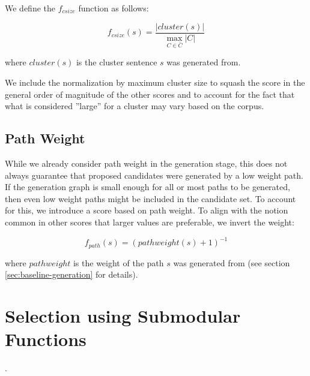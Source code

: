 \documentclass[a4paper,BCOR=10mm]{report}
\numberwithin{lemma}{chapter}
\numberwithin{definition}{chapter}
\begin{document}
We define the $f_{\mathit{csize}}$ function as follows:

\begin{equation}
f_{\mathit{csize}}(s) = \frac{|\mathit{cluster}(s)|}{\max_{C \in \bar{C}}{|C|}}
\end{equation}

where $\mathit{cluster}(s)$ is the cluster sentence $s$ was generated from.

We include the normalization by maximum cluster size to squash the score in the general order of magnitude of the other scores and to account for the fact that what is considered ''large'' for a cluster may vary based on the corpus.


\subsection{Path Weight}

While we already consider path weight in the generation stage, this does not always guarantee that proposed candidates were generated by a low weight path. If the generation graph is small enough for all or most paths to be generated, then even low weight paths might be included in the candidate set.
To account for this, we introduce a score based on path weight. To align with the notion common in other scores that larger values are preferable, we invert the weight:

\begin{equation}
f_{path}(s) = (\mathit{pathweight}(s) + 1)^{-1}
\end{equation}

where $\mathit{pathweight}$ is the weight of the path $s$ was generated from (see section \ref{sec:baseline-generation} for details).


\section{Selection using Submodular Functions} \label{sec:system-selection}.

\end{document}
